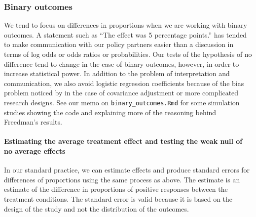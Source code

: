 \documentclass[
  12pt,
]{book}
\let\oldparagraph\paragraph
\renewcommand{\paragraph}[1]{\oldparagraph{#1}\mbox{}}
\theoremstyle{definition}
\theoremstyle{definition}
\theoremstyle{definition}
\theoremstyle{remark}
\begin{document}
\hypertarget{binary-outcomes}{%
\subsubsection{Binary outcomes}\label{binary-outcomes}}

We tend to focus on differences in proportions when we are working with
binary outcomes. A statement such as ``The effect was 5 percentage
points.'' has tended to make communication with our policy partners
easier than a discussion in terms of log odds or odds ratios or
probabilities. Our tests of the hypothesis of no difference tend to
change in the case of binary outcomes, however, in order to increase
statistical power. In addition to the problem of interpretation and
communication, we also avoid logistic regression coefficients because of
the bias problem noticed by \citet{freedman2008randomization} in the
case of covariance adjustment or more complicated research designs. See
our memo on \texttt{binary\_outcomes.Rmd} for some simulation studies
showing the code and explaining more of the reasoning behind Freedman's
results.

\hypertarget{estimating-the-average-treatment-effect-and-testing-the-weak-null-of-no-average-effects-1}{%
\paragraph{Estimating the average treatment effect and testing the weak
null of no average
effects}\label{estimating-the-average-treatment-effect-and-testing-the-weak-null-of-no-average-effects-1}}

In our standard practice, we can estimate effects and produce standard
errors for differences of proportions using the same process as above.
The estimate is an estimate of the difference in proportions of positive
responses between the treatment conditions. The standard error is valid
because it is based on the design of the study and not the distribution
of the outcomes.
\end{document}
